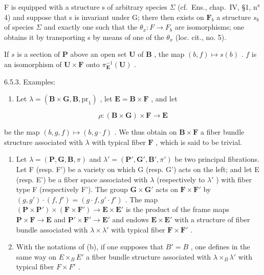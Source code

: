 F is equipped with a structure s of arbitrary species \(\Sigma\) (cf.~Ens., chap.~IV, §1, n° 4) and suppose that s is invariant under G; there then exists on \(\mathbf{F}_{b}\) a structure \(s_{b}\) of species \(\Sigma\) and exactly one such that the \(\theta_{x}: F \to F_{b}\) are isomorphisms; one obtains it by transporting s by means of one of the \(\theta_{x}\) (loc. cit., no. 5).

If \(s\) is a section of \(\mathbf{P}\) above an open set \(\mathbf{U}\) of \(\mathbf{B}\) , the map \((b, f) \mapsto s(b)\) . \(f\) is an isomorphism of \(\mathbf{U} \times \mathbf{F}\) onto \(\pi_{\mathbf{E}}^{-1}(\mathbf{U})\) .

6.5.3. Examples:

\begin{enumerate}
\def\labelenumi{(\alph{enumi})}
\tightlist
\item
  Let \(\lambda = (\mathbf{B} \times \mathbf{G}, \mathbf{B}, \mathrm{pr}_1)\) , let \(\mathbf{E} = \mathbf{B} \times \mathbf{F}\) , and let
\end{enumerate}

\[
\rho : (\mathbf {B} \times \mathbf {G}) \times \mathbf {F} \rightarrow \mathbf {E}
\]

be the map \((b, g, f) \mapsto (b, g \cdot f)\) . We thus obtain on \(\mathbf{B} \times \mathbf{F}\) a fiber bundle structure associated with \(\lambda\) with typical fiber \(\mathbf{F}\) , which is said to be trivial.

\begin{enumerate}
\def\labelenumi{(\alph{enumi})}
\setcounter{enumi}{1}
\item
  Let \(\lambda = (\mathbf{P},\mathbf{G},\mathbf{B},\pi)\) and \(\lambda' = (\mathbf{P}',\mathbf{G}',\mathbf{B}',\pi')\) be two principal fibrations. Let F (resp. F') be a variety on which G (resp. G') acts on the left; and let E (resp. E') be a fiber space associated with \(\lambda\) (respectively to \(\lambda'\) ) with fiber type F (respectively F'). The group \(\mathbf{G} \times \mathbf{G}'\) acts on \(\mathbf{F} \times \mathbf{F}'\) by \((g, g') \cdot (f, f') = (g \cdot f, g' \cdot f')\) . The map \((\mathbf{P} \times \mathbf{P}') \times (\mathbf{F} \times \mathbf{F}') \to \mathbf{E} \times \mathbf{E}'\) is the product of the frame maps \(\mathbf{P} \times \mathbf{F} \to \mathbf{E}\) and \(\mathbf{P}' \times \mathbf{F}' \to \mathbf{E}'\) and endows \(\mathbf{E} \times \mathbf{E}'\) with a structure of fiber bundle associated with \(\lambda \times \lambda'\) with typical fiber \(\mathbf{F} \times \mathbf{F}'\) .
\item
  With the notations of (b), if one supposes that \(B' = B\) , one defines in the same way on \(E \times_{B} E'\) a fiber bundle structure associated with \(\lambda \times_{B} \lambda'\) with typical fiber \(F \times F'\) .
\end{enumerate}

